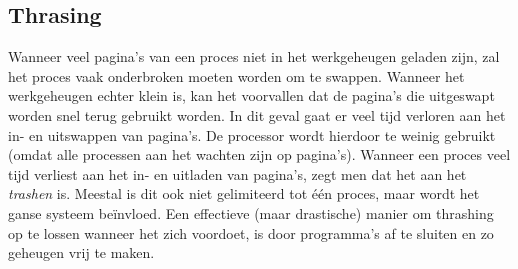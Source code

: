 \subsection{Thrasing}

Wanneer veel pagina's van een proces niet in het werkgeheugen geladen zijn, zal het proces vaak onderbroken moeten worden om te swappen. Wanneer het werkgeheugen echter klein is, kan het voorvallen dat de pagina's die uitgeswapt worden snel terug gebruikt worden. In dit geval gaat er veel tijd verloren aan het in- en uitswappen van pagina's. De processor wordt hierdoor te weinig gebruikt (omdat alle processen aan het wachten zijn op pagina's). Wanneer een proces veel tijd verliest aan het in- en uitladen van pagina's, zegt men dat het aan het \emph{trashen} is. Meestal is dit ook niet gelimiteerd tot \'e\'en proces, maar wordt het ganse systeem be\"invloed. Een effectieve (maar drastische) manier om thrashing op te lossen wanneer het zich voordoet, is door programma's af te sluiten en zo geheugen vrij te maken.







